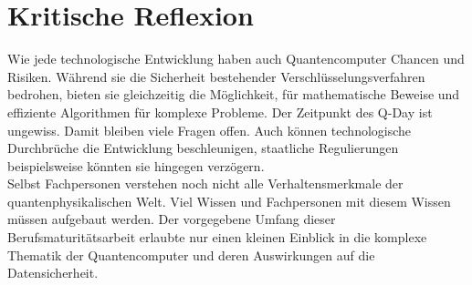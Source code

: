 \section{Kritische Reflexion}
Wie jede technologische Entwicklung haben auch Quantencomputer Chancen und Risiken.
Während sie die Sicherheit bestehender Verschlüsselungsverfahren bedrohen, bieten sie gleichzeitig die Möglichkeit, 
für mathematische Beweise und effiziente Algorithmen für komplexe Probleme.
Der Zeitpunkt des Q-Day ist ungewiss. Damit bleiben viele Fragen offen. 
Auch können technologische Durchbrüche die Entwicklung beschleunigen, staatliche Regulierungen beispielsweise könnten sie hingegen verzögern.
\\
Selbst Fachpersonen verstehen noch nicht alle Verhaltensmerkmale der quantenphysikalischen Welt. Viel Wissen und Fachpersonen mit diesem Wissen müssen aufgebaut werden.
Der vorgegebene Umfang dieser Berufsmaturitätsarbeit erlaubte nur einen kleinen Einblick in die komplexe Thematik der Quantencomputer und deren Auswirkungen auf die Datensicherheit.

